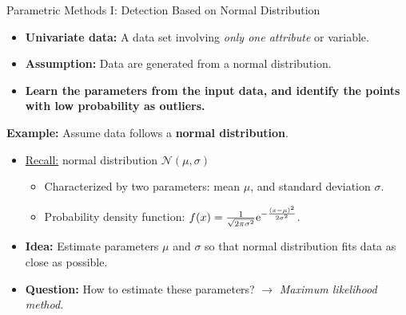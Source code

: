 \begin{frame}{Parametric Methods I: Detection Based on Normal Distribution}
	\begin{itemize}
		\item \textbf{Univariate data:} A data set involving \textit{only one attribute} or variable.
		\item \textbf{Assumption:} Data are generated from a normal distribution.
		\item \textbf{Learn the parameters from the input data, and identify the points with low probability as outliers.}
	\end{itemize}
	\vspace*{0.5em}
	\textbf{Example:} Assume data follows a \textbf{normal distribution}.
	\begin{itemize}
		\item \underline{Recall:} normal distribution $\mathcal{N}(\mu, \sigma)$
		      \begin{itemize}
			      \item Characterized by two parameters: mean $\mu$, and standard deviation $\sigma$.
			      \item Probability density function: $f(x)=\frac{1}{\sqrt{2\pi \sigma^2}} {\rm e}^{-\frac{(x-\mu)^2}{2\sigma^2}}$.
		      \end{itemize}
		\item \textbf{\color{faugray}Idea:} Estimate parameters $\mu$ and $\sigma$ so that normal distribution fits data as close as possible.
		\item \textbf{Question:} How to estimate these parameters? $\rightarrow$ \textit{\color{faugray}Maximum likelihood method.}
	\end{itemize}
\end{frame}



